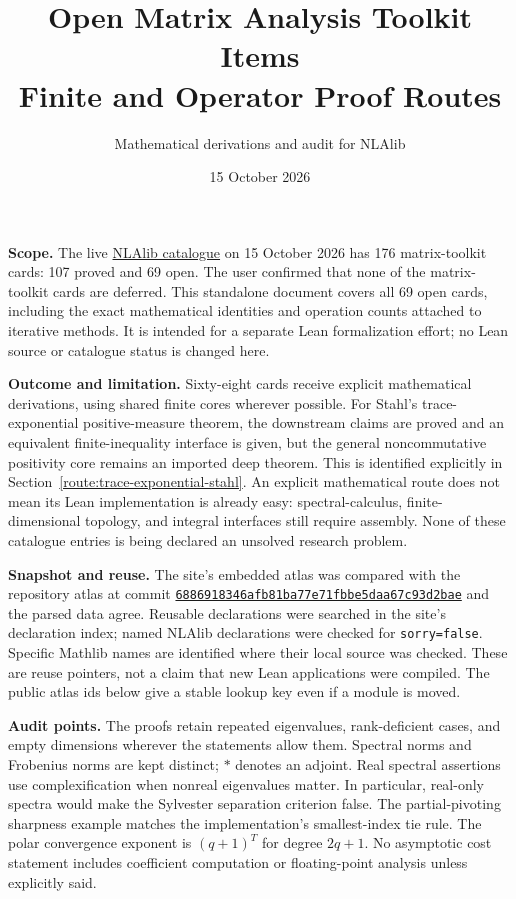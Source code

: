 \documentclass[11pt,a4paper]{article}
\title{Open Matrix Analysis Toolkit Items\\
Finite and Operator Proof Routes}
\author{Mathematical derivations and audit for NLAlib}
\date{15 October 2026}
\DeclareRobustCommand{\code}[1]{{\footnotesize\urlstyle{tt}\nolinkurl{#1}}}
\begin{document}
\maketitle

\textbf{Scope.} The live
\href{https://research.chen.pw/NLAlib/}{NLAlib catalogue}
on 15 October 2026 has 176 matrix-toolkit cards: 107 proved and 69 open.
The user confirmed that none of the matrix-toolkit cards are deferred.
This standalone document covers all 69 open cards, including the exact
mathematical identities and operation counts attached to iterative methods.
It is intended for a separate Lean formalization effort; no Lean source or
catalogue status is changed here.

\textbf{Outcome and limitation.} Sixty-eight cards receive explicit
mathematical derivations, using shared finite cores wherever possible.
For Stahl's trace-exponential positive-measure theorem, the downstream
claims are proved and an equivalent finite-inequality interface is given,
but the general noncommutative positivity core remains an imported deep
theorem. This is identified explicitly in Section~\ref{route:trace-exponential-stahl}.
An explicit mathematical route does not mean its Lean implementation is
already easy: spectral-calculus, finite-dimensional topology, and integral
interfaces still require assembly. None of these catalogue entries is being
declared an unsolved research problem.

\textbf{Snapshot and reuse.} The site's embedded atlas was compared with
the repository atlas at commit
\href{https://github.com/tchen-research/NLAlib/tree/6886918346afb81ba77e71fbbe5daa67c93d2bae}
{\texttt{6886918346afb81ba77e71fbbe5daa67c93d2bae}} and the parsed data agree.
Reusable declarations were searched in the site's declaration index;
named NLAlib declarations were checked for \code{sorry=false}.
Specific Mathlib names are identified where their local source was checked.
These are reuse pointers, not a claim that new Lean applications were compiled.
The public atlas ids below give a stable lookup key even if a module is moved.

\textbf{Audit points.} The proofs retain repeated eigenvalues, rank-deficient
cases, and empty dimensions wherever the statements allow them. Spectral
norms and Frobenius norms are kept distinct; $*$ denotes an adjoint.
Real spectral assertions use complexification when nonreal eigenvalues
matter. In particular, real-only spectra would make the Sylvester
separation criterion false. The partial-pivoting sharpness example matches
the implementation's smallest-index tie rule. The polar convergence exponent
is $(q+1)^T$ for degree $2q+1$. No asymptotic cost statement includes
coefficient computation or floating-point analysis unless explicitly said.
\end{document}
